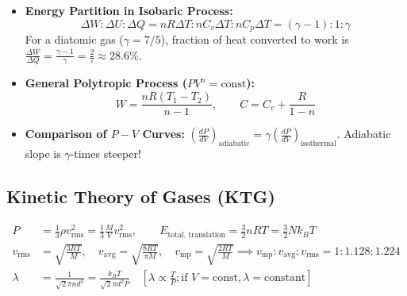 \documentclass[11pt,a4paper]{article}
\begin{document}
\begin{usecasebox}
\begin{itemize}
  \item \textbf{Energy Partition in Isobaric Process:}
  \begin{equation*}
    \Delta W : \Delta U : \Delta Q = nR\Delta T : nC_v\Delta T : nC_p\Delta T = (\gamma - 1) : 1 : \gamma
  \end{equation*}
  For a diatomic gas ($\gamma = 7/5$), fraction of heat converted to work is $\frac{\Delta W}{\Delta Q} = \frac{\gamma - 1}{\gamma} = \frac{2}{7} \approx 28.6\%$.
  \item \textbf{General Polytropic Process ($P V^n = \text{const}$):}
  \begin{equation*}
    W = \frac{nR(T_1 - T_2)}{n - 1}, \qquad C = C_v + \frac{R}{1 - n}
  \end{equation*}
  \item \textbf{Comparison of $P-V$ Curves:} $\left(\frac{dP}{dV}\right)_{\text{adiabatic}} = \gamma\left(\frac{dP}{dV}\right)_{\text{isothermal}}$. Adiabatic slope is $\gamma$-times steeper!
\end{itemize}
\end{usecasebox}

\subsection{Kinetic Theory of Gases (KTG)}

\begin{formulabox}
\begin{align}
  P &= \frac{1}{3}\rho v_{\text{rms}}^2 = \frac{1}{3}\frac{M}{V}v_{\text{rms}}^2, \qquad E_{\text{total, translation}} = \frac{3}{2}n R T = \frac{3}{2}N k_B T \\
  v_{\text{rms}} &= \sqrt{\frac{3RT}{M}}, \quad v_{\text{avg}} = \sqrt{\frac{8RT}{\pi M}}, \quad v_{\text{mp}} = \sqrt{\frac{2RT}{M}} \implies v_{\text{mp}} : v_{\text{avg}} : v_{\text{rms}} = 1 : 1.128 : 1.224 \\
  \lambda &= \frac{1}{\sqrt{2}\pi n d^2} = \frac{k_B T}{\sqrt{2}\pi d^2 P} \quad [\lambda \propto \frac{T}{P}; \text{if } V=\text{const}, \lambda = \text{constant}]
\end{align}
\end{formulabox}

\newpage

\end{document}
